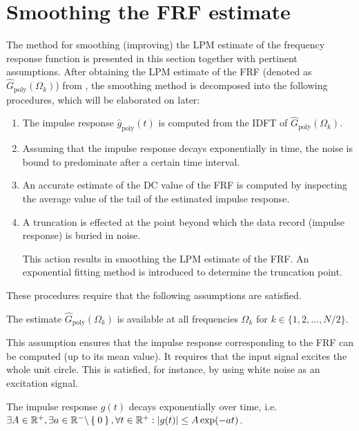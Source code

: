 \section{Smoothing the \gls{FRF} estimate}\label{se:smoothingFRFestimate}
The method for smoothing (improving) the \gls{LPM} estimate of the frequency response function  is presented in this section together with pertinent assumptions. After obtaining the \gls{LPM} estimate of the \gls{FRF} (denoted as $\hat{G}_{\mathrm{poly}}(\Omega_k)$) from , the smoothing method is decomposed into the following procedures, which will be elaborated on later:
\begin{enumerate}
\item The impulse response $\hat g_\mathrm{poly}(t)$  is computed from the \gls{IDFT} of $\hat{G}_{\mathrm{poly}}(\Omega_k)$.

\item
Assuming that the impulse response decays exponentially in time, the noise is bound to predominate after a certain time interval.

\item
An accurate estimate of the \gls{DC} value of the \gls{FRF} is computed by inspecting the average value of the tail of the estimated impulse response.

\item
A truncation is effected at the point beyond which the data record (impulse response) is buried in noise.

This action results in smoothing the \gls{LPM} estimate of the \gls{FRF}.
An exponential fitting method is introduced to determine the truncation point.
\end{enumerate}

These procedures require that the following assumptions are satisfied.

\begin{assumption}
The estimate $\hat G_\mathrm{poly}(\Omega_k)$ is available at all frequencies $\Omega_k$ for $k\in\{1,2,\dots,N/2\}$.
\end{assumption}

This assumption ensures that the impulse response corresponding to the \gls{FRF} can be computed (up to its mean value). It requires that the input signal excites the whole unit circle. This is satisfied, for instance, by using white noise as an excitation signal.


\begin{assumption}\label{ass:imprespdecay}
The impulse response $g(t)$ decays exponentially over time, i.e. $\exists A \in \mathbb{R}^{+}, \exists a \in \mathbb{R}^{-} \backslash \Set{0}, \forall t \in \mathbb{R}^{+}: \left| g(t) \right| \leq A \exp(- a t)$.
\end{assumption}

